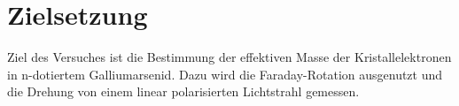 \section{Zielsetzung}
\label{sec:Zielsetzung}
Ziel des Versuches ist die Bestimmung der effektiven Masse der Kristallelektronen in n-dotiertem Galliumarsenid.
Dazu wird die Faraday-Rotation ausgenutzt und die Drehung von einem linear polarisierten Lichtstrahl gemessen.